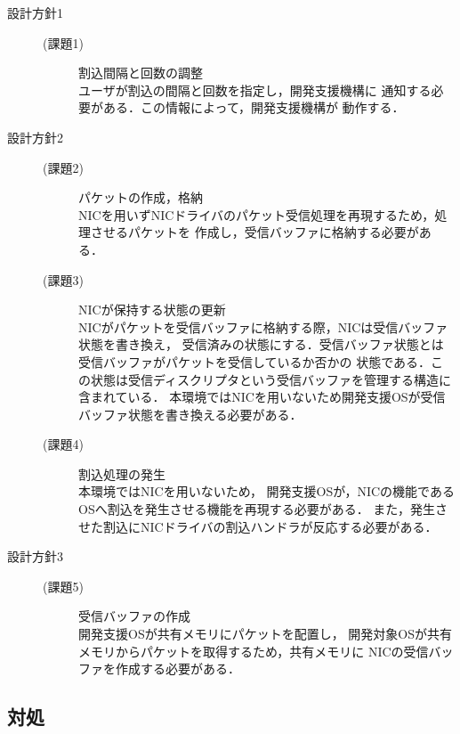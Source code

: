 \documentclass[submit,techreq,noauthor,dvipdfmx]{ipsj}
\begin{document}
\begin{description}
    \item[設計方針1]\mbox{}
        \begin{description}
            \item[(課題1)] 割込間隔と回数の調整\\
                ユーザが割込の間隔と回数を指定し，開発支援機構に
                通知する必要がある．この情報によって，開発支援機構が
                動作する．
        \end{description}
    \item[設計方針2]\mbox{}
        \begin{description}
            \item[(課題2)] パケットの作成，格納\\
                NICを用いずNICドライバのパケット受信処理を再現するため，処理させるパケットを
                作成し，受信バッファに格納する必要がある．
            \item[(課題3)] NICが保持する状態の更新\\
                NICがパケットを受信バッファに格納する際，NICは受信バッファ状態を書き換え，
                受信済みの状態にする．受信バッファ状態とは受信バッファがパケットを受信しているか否かの
                状態である．この状態は受信ディスクリプタという受信バッファを管理する構造に含まれている．
                本環境ではNICを用いないため開発支援OSが受信バッファ状態を書き換える必要がある．
            \item[(課題4)] 割込処理の発生\\
                本環境ではNICを用いないため，
                開発支援OSが，NICの機能であるOSへ割込を発生させる機能を再現する必要がある．
                また，発生させた割込にNICドライバの割込ハンドラが反応する必要がある．
        \end{description}
    \item[設計方針3]\mbox{}
        \begin{description}
            \item[(課題5)] 受信バッファの作成\\
                開発支援OSが共有メモリにパケットを配置し，
                開発対象OSが共有メモリからパケットを取得するため，共有メモリに
                NICの受信バッファを作成する必要がある．
        \end{description}
\end{description}

\subsection{対処}\label{sec:deal}
\end{document}
